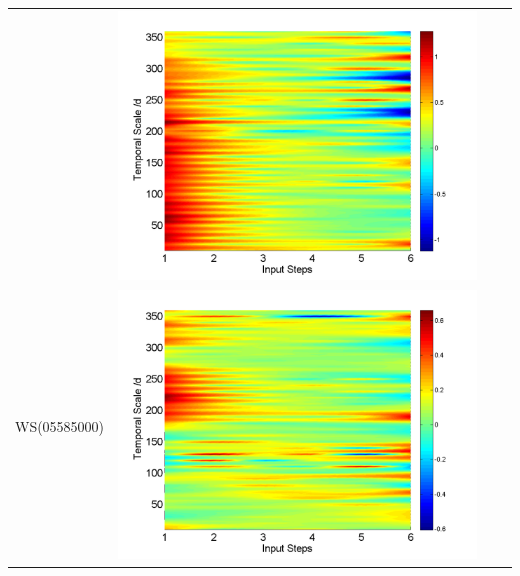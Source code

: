 \documentclass[review]{elsarticle}
\begin{document}
\begin{table}[H]
\begin{tabular}{cccc}
&\begin{minipage}{.3\textwidth}\includegraphics[width=\linewidth]{resultgraph/02143000qdiff_former.png}\end{minipage}
\\
WS(05585000)
&\begin{minipage}{.3\textwidth}\includegraphics[width=\linewidth]{resultgraph/05585000pdiff_former.png}\end{minipage}

\end{tabular}
\end{table}
\end{document}
